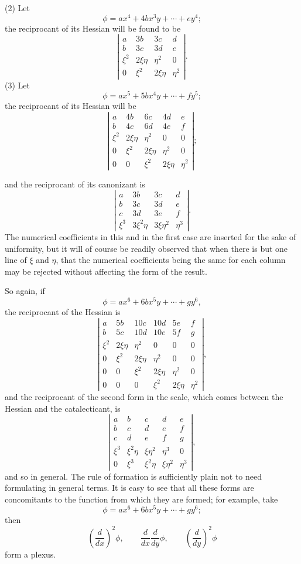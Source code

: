 \documentclass[11pt]{article}
\newcommand{\sourcepage}[1]{\marginpar{\scriptsize p.~#1}}
\begin{document}
{{(2) Let
\[
\phi=ax^4+4bx^3y+\cdots+ey^4;
\]
the reciprocant of its Hessian will be found to be
\[
\left|\begin{array}{cccc}
a&3b&3c&d\\
b&3c&3d&e\\
\xi^2&2\xi\eta&\eta^2&0\\
0&\xi^2&2\xi\eta&\eta^2
\end{array}\right|.
\]
(3) Let
\[
\phi=ax^5+5bx^4y+\cdots+fy^5;
\]
the reciprocant of its Hessian will be
\[
\left|\begin{array}{ccccc}
a&4b&6c&4d&e\\
b&4c&6d&4e&f\\
\xi^2&2\xi\eta&\eta^2&0&0\\
0&\xi^2&2\xi\eta&\eta^2&0\\
0&0&\xi^2&2\xi\eta&\eta^2
\end{array}\right|;
\]

\sourcepage{344}
and the reciprocant of its canonizant is
\[
\left|\begin{array}{cccc}
a&3b&3c&d\\
b&3c&3d&e\\
c&3d&3e&f\\
\xi^3&3\xi^2\eta&3\xi\eta^2&\eta^3
\end{array}\right|.
\]
The numerical coefficients in this and in the first case are inserted for the sake of uniformity, but it will of course be readily observed that when there is but one line of $\xi$ and $\eta$, that the numerical coefficients being the same for each column may be rejected without affecting the form of the result.

So again, if
\[
\phi=ax^6+6bx^5y+\cdots+gy^6,
\]
the reciprocant of the Hessian is
\[
\left|\begin{array}{cccccc}
a&5b&10c&10d&5e&f\\
b&5c&10d&10e&5f&g\\
\xi^2&2\xi\eta&\eta^2&0&0&0\\
0&\xi^2&2\xi\eta&\eta^2&0&0\\
0&0&\xi^2&2\xi\eta&\eta^2&0\\
0&0&0&\xi^2&2\xi\eta&\eta^2
\end{array}\right|,
\]
and the reciprocant of the second form in the scale, which comes between the Hessian and the catalecticant, is
\[
\left|\begin{array}{ccccc}
a&b&c&d&e\\
b&c&d&e&f\\
c&d&e&f&g\\
\xi^3&\xi^2\eta&\xi\eta^2&\eta^3&0\\
0&\xi^3&\xi^2\eta&\xi\eta^2&\eta^3
\end{array}\right|,
\]
and so in general. The rule of formation is sufficiently plain not to need formulating in general terms. It is easy to see that all these forms are concomitants to the function from which they are formed; for example, take
\[
\phi=ax^6+6bx^5y+\cdots+gy^6;
\]
then
\[
\left(\frac{d}{dx}\right)^2\phi,\qquad
\frac{d}{dx}\frac{d}{dy}\phi,\qquad
\left(\frac{d}{dy}\right)^2\phi
\]
form a plexus.

}}
\end{document}
